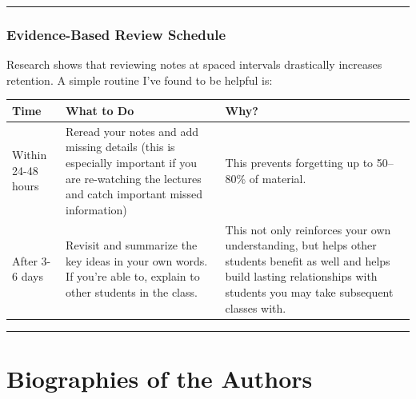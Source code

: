 \documentclass[
  a4paper,
  DIV=11,
  numbers=noendperiod]{scrartcl}
\begin{document}
\begin{center}\rule{0.5\linewidth}{0.5pt}\end{center}

\subsubsection{Evidence-Based Review
Schedule}\label{evidence-based-review-schedule}

Research shows that reviewing notes at spaced intervals drastically
increases retention. A simple routine I've found to be helpful is:

\begin{longtable}[]{@{}
  >{\raggedright\arraybackslash}p{}
  >{\raggedright\arraybackslash}p{}
  >{\raggedright\arraybackslash}p{}@{}}
\toprule\noalign{}
\begin{minipage}[b]{\linewidth}\raggedright
Time
\end{minipage} & \begin{minipage}[b]{\linewidth}\raggedright
What to Do
\end{minipage} & \begin{minipage}[b]{\linewidth}\raggedright
Why?
\end{minipage} \\
\midrule\noalign{}
\endhead
\bottomrule\noalign{}
\endlastfoot
Within 24-48 hours & Reread your notes and add missing details (this is
especially important if you are re-watching the lectures and catch
important missed information) & This prevents forgetting up to 50--80\%
of material. \\
After 3-6 days & Revisit and summarize the key ideas in your own words.
If you're able to, explain to other students in the class. & This not
only reinforces your own understanding, but helps other students benefit
as well and helps build lasting relationships with students you may take
subsequent classes with. \\
\end{longtable}

\begin{center}\rule{0.5\linewidth}{0.5pt}\end{center}

\section{Biographies of the Authors}\label{biographies-of-the-authors}
\end{document}
